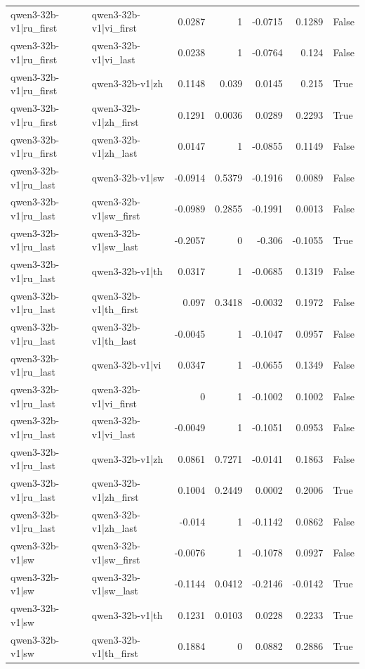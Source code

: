 \begin{table}
\begin{tabular}{l l r r r r l}
qwen3-32b-v1|ru_first & qwen3-32b-v1|vi_first & 0.0287 & 1 & -0.0715 & 0.1289 & False \\
qwen3-32b-v1|ru_first & qwen3-32b-v1|vi_last & 0.0238 & 1 & -0.0764 & 0.124 & False \\
qwen3-32b-v1|ru_first & qwen3-32b-v1|zh & 0.1148 & 0.039 & 0.0145 & 0.215 & True \\
qwen3-32b-v1|ru_first & qwen3-32b-v1|zh_first & 0.1291 & 0.0036 & 0.0289 & 0.2293 & True \\
qwen3-32b-v1|ru_first & qwen3-32b-v1|zh_last & 0.0147 & 1 & -0.0855 & 0.1149 & False \\
qwen3-32b-v1|ru_last & qwen3-32b-v1|sw & -0.0914 & 0.5379 & -0.1916 & 0.0089 & False \\
qwen3-32b-v1|ru_last & qwen3-32b-v1|sw_first & -0.0989 & 0.2855 & -0.1991 & 0.0013 & False \\
qwen3-32b-v1|ru_last & qwen3-32b-v1|sw_last & -0.2057 & 0 & -0.306 & -0.1055 & True \\
qwen3-32b-v1|ru_last & qwen3-32b-v1|th & 0.0317 & 1 & -0.0685 & 0.1319 & False \\
qwen3-32b-v1|ru_last & qwen3-32b-v1|th_first & 0.097 & 0.3418 & -0.0032 & 0.1972 & False \\
qwen3-32b-v1|ru_last & qwen3-32b-v1|th_last & -0.0045 & 1 & -0.1047 & 0.0957 & False \\
qwen3-32b-v1|ru_last & qwen3-32b-v1|vi & 0.0347 & 1 & -0.0655 & 0.1349 & False \\
qwen3-32b-v1|ru_last & qwen3-32b-v1|vi_first & 0 & 1 & -0.1002 & 0.1002 & False \\
qwen3-32b-v1|ru_last & qwen3-32b-v1|vi_last & -0.0049 & 1 & -0.1051 & 0.0953 & False \\
qwen3-32b-v1|ru_last & qwen3-32b-v1|zh & 0.0861 & 0.7271 & -0.0141 & 0.1863 & False \\
qwen3-32b-v1|ru_last & qwen3-32b-v1|zh_first & 0.1004 & 0.2449 & 0.0002 & 0.2006 & True \\
qwen3-32b-v1|ru_last & qwen3-32b-v1|zh_last & -0.014 & 1 & -0.1142 & 0.0862 & False \\
qwen3-32b-v1|sw & qwen3-32b-v1|sw_first & -0.0076 & 1 & -0.1078 & 0.0927 & False \\
qwen3-32b-v1|sw & qwen3-32b-v1|sw_last & -0.1144 & 0.0412 & -0.2146 & -0.0142 & True \\
qwen3-32b-v1|sw & qwen3-32b-v1|th & 0.1231 & 0.0103 & 0.0228 & 0.2233 & True \\
qwen3-32b-v1|sw & qwen3-32b-v1|th_first & 0.1884 & 0 & 0.0882 & 0.2886 & True \\

\end{tabular}
\end{table}
